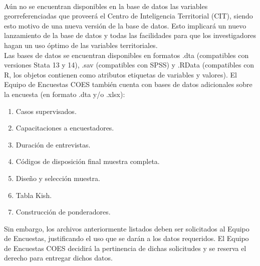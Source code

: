\documentclass[12pt]{report}
\begin{document}
\vspace{0.3cm}
\noindent {}\\
\vspace{0.3cm}

Aún no se encuentran disponibles en la base de datos las variables georreferenciadas que proveerá el Centro de Inteligencia Territorial (CIT), siendo esto motivo de una nueva versión de la base de datos. Esto implicará un nuevo lanzamiento de la base de datos y todas las facilidades para que los investigadores hagan un uso óptimo de las variables territoriales.\\

Las bases de datos se encuentran disponibles en formatos .dta (compatibles con versiones Stata 13 y 14), .sav (compatibles con SPSS) y .RData (compatibles con R, los objetos contienen como atributos etiquetas de variables y valores). El Equipo de Encuestas COES también cuenta con bases de datos adicionales sobre la encuesta (en formato .dta y/o .xlsx):\\
\begin{enumerate}[noitemsep]

	\item Casos supervisados.
	\item Capacitaciones a encuestadores.
	\item Duración de entrevistas.
	\item Códigos de disposición final muestra completa.
	\item Diseño y selección muestra.
	\item Tabla Kish.
	\item Construcción de ponderadores.
\end{enumerate}

Sin embargo, los archivos anteriormente listados deben ser solicitados al Equipo de Encuestas, justificando el uso que se darán a los datos requeridos. El Equipo de Encuestas COES decidirá la pertinencia de dichas solicitudes y se reserva el derecho para entregar dichos datos. \\
\end{document}
